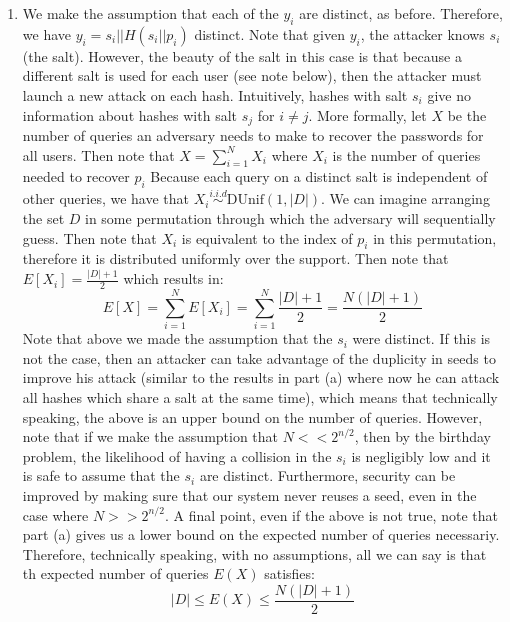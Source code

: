 \documentclass{article}
\begin{document}
\begin{enumerate}[noitemsep,topsep=\mdcompacttopsep,start=3]
\begin{enumerate}[noitemsep,topsep=\mdcompacttopsep,label=\alph*.]
\item{}We make the assumption that each of the $y_i$ are distinct, as before. Therefore, we 
have $y_i = s_i || H(s_i || p_i)$ distinct. Note that given $y_i$, the 
attacker knows $s_i$ (the salt). However, the beauty of the salt in this case is that 
because a different salt is used for each user (see note below), then the attacker must
launch a new attack on each hash. Intuitively, hashes with salt $s_i$ give no information
about hashes with salt $s_j$ for $i \neq j$. More formally, let $X$ be the number of 
queries an adversary needs to make to recover the passwords for all users. Then note 
that $X = \sum_{i=1}^N X_i$ where $X_i$ is the number of queries needed to recover $p_i$ 
Because each query on a distinct salt is independent of other queries, we have that
$X_i \stackrel{i.i.d}{\sim} \text{DUnif}(1,|D|)$. We can imagine arranging the set $D$ in 
some permutation through which the adversary will sequentially guess. Then note that $X_i$
is equivalent to the index of $p_i$ in this permutation, therefore it is distributed 
uniformly over the support. Then note that $E[X_i] = \frac{|D| + 1}{2}$ which results in:
\noindent\noindent\[%
E[X] = \sum_{i=1}^N E[X_i] = \sum_{i=1}^N \frac{|D| + 1}{2} = \frac{N(|D| + 1)}{2} 
\]%
Note that above we made the assumption that the $s_i$ were distinct. If this is not the 
case, then an attacker can take advantage of the duplicity in seeds to improve his attack 
(similar to the results in part (a) where now he can attack all hashes which share a salt
at the same time), which means that technically speaking, the above
is an upper bound on the number of queries. However, note that if we make the assumption 
that $N << 2^{n/2}$,
then by the birthday problem, the likelihood of having a collision in the $s_i$ is 
negligibly low and it is safe to assume that the $s_i$ are distinct. Furthermore, security
can be improved by making sure that our system never reuses a seed, even in the case where
$N >> 2^{n/2}$. A final point, even if the above is not true, note that part (a) gives us 
a lower bound on the expected number of queries necessariy. Therefore, technically speaking,
with no assumptions, all we can say is that th expected number of queries $E(X)$ satisfies:
\noindent\noindent\[%
|D| \leq E(X) \leq \frac{N(|D| + 1)}{2} 
\]%
\end{enumerate}%
\end{enumerate}%
\end{document}
